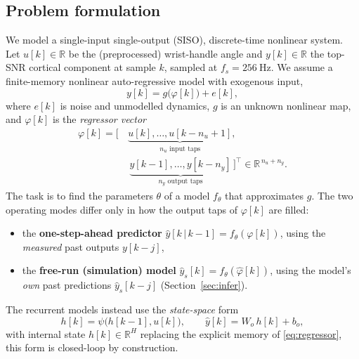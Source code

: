\documentclass[10pt,twocolumn,letterpaper]{article}
\begin{document}
\subsection{Problem formulation}\label{sec:formulation}
We model a single-input single-output (SISO), discrete-time nonlinear
system. Let $u[k]\in\mathbb{R}$ be the (preprocessed) wrist-handle angle
and $y[k]\in\mathbb{R}$ the top-SNR cortical component at sample $k$,
sampled at $f_s=256~\mathrm{Hz}$. We assume a finite-memory nonlinear
auto-regressive model with exogenous input,
\begin{equation}
    y[k] = g\big(\varphi[k]\big) + e[k],
    \label{eq:plant}
\end{equation}
where $e[k]$ is noise and unmodelled dynamics, $g$ is an unknown
nonlinear map, and $\varphi[k]$ is the \emph{regressor vector}
\begin{equation}
\begin{split}
    \varphi[k] = \big[\,
      &\underbrace{u[k],\dots,u[k-n_u+1]}_{n_u\text{ input taps}},\\
      &\,\underbrace{y[k-1],\dots,y[k-n_y]}_{n_y\text{ output taps}}
    \,\big]^{\!\top}
    \in \mathbb{R}^{\,n_u+n_y}.
\end{split}
    \label{eq:regressor}
\end{equation}
The task is to find the parameters $\theta$ of a model $f_\theta$ that
approximates $g$. The two operating modes differ only in how the output
taps of $\varphi[k]$ are filled:
\begin{itemize}
    \item the \textbf{one-step-ahead predictor}
          $\hat{y}[k\,|\,k-1]=f_\theta(\varphi[k])$, using the
          \emph{measured} past outputs $y[k-j]$,
    \item the \textbf{free-run (simulation) model}
          $\hat{y}_s[k]=f_\theta(\hat\varphi[k])$, using the model's
          \emph{own} past predictions $\hat{y}_s[k-j]$
          (Section~\ref{sec:infer}).
\end{itemize}
The recurrent models instead use the \emph{state-space} form
\begin{equation}
    h[k] = \psi\big(h[k-1],u[k]\big), \qquad
    \hat{y}[k] = W_o\,h[k] + b_o,
    \label{eq:statespace}
\end{equation}
with internal state $h[k]\in\mathbb{R}^{H}$ replacing the explicit
memory of \eqref{eq:regressor}, this form is closed-loop by construction.
\end{document}
